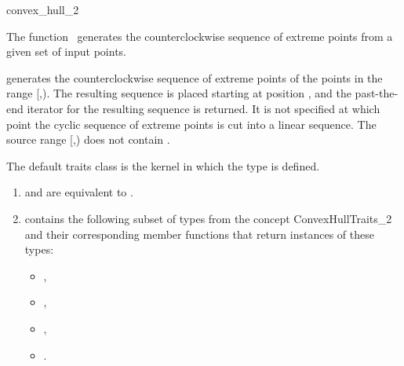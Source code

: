 

\begin{ccRefFunction}{convex_hull_2}  %

\ccDefinition
  
The function \ccRefName\ generates the counterclockwise sequence of extreme
points from a given set of input points.  


            {generates the counterclockwise sequence of extreme points
            of the points in the range [,).
            The resulting sequence is placed starting at position
            , and the past-the-end iterator for the resulting
            sequence is returned. It is not specified at which point the
            cyclic sequence of extreme points is cut into a linear sequence.
            \ccPrecond %
            The source range [,) does not contain
            .}

The default traits class  is the kernel in which
the type  is defined. 

\begin{enumerate}
   \item    {} and 
            are equivalent to .
   \item    {} contains the following subset of types from
            the concept ConvexHullTraits\_2 and their corresponding member
            functions that return instances of these types:
            \begin{itemize}
                \item {},
                \item {}, 
                \item {},
                \item {}.
            \end{itemize}
\end{enumerate}



\end{ccRefFunction}
